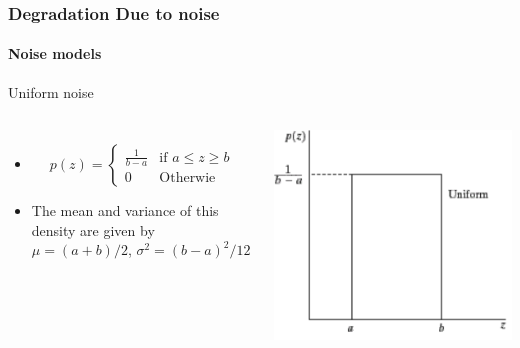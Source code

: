 \documentclass{beamer}
\begin{document}
\begin{frame}	
\frametitle{Degradation Due to noise}
\framesubtitle{Noise models}
\begin{block}{Uniform noise}
\begin{columns}
\begin{itemize}
	\item [] 
		\[
 	p(z) = 
  	\begin{cases} 
   	\frac{1}{b-a} & \text{if } a\leq z \geq b \\
   	0 & \text{Otherwie } 
  	\end{cases}
	\]
	\item The mean and variance of this density are given by
	$\mu = (a+b)/2$, $\sigma^2 = (b-a)^2/12$  
\end{itemize}
\includegraphics[scale=0.22]{images/L5_DR_UN1.png}
\end{columns}		
\end{block}
\end{frame}
\end{document}
